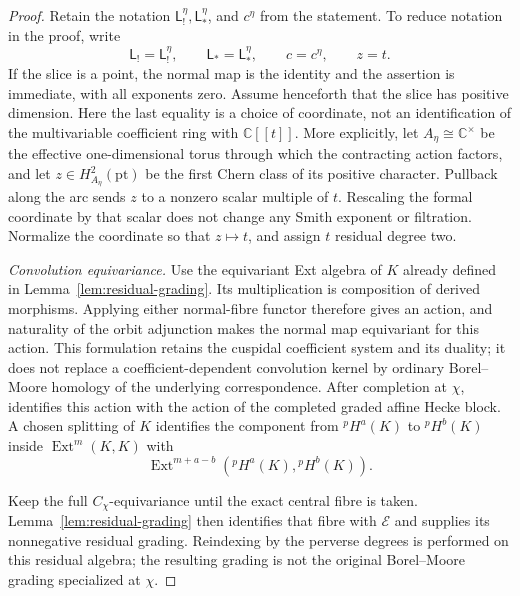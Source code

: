 \documentclass[11pt]{amsart}
\theoremstyle{definition}
\theoremstyle{remark}
\begin{document}
\begin{proof}
Retain the notation $\mathsf L_!^\eta,\mathsf L_*^\eta$, and $c^\eta$ from
the statement.  To reduce notation in the proof, write
\[
 \mathsf L_!=\mathsf L_!^\eta,\qquad
 \mathsf L_*=\mathsf L_*^\eta,\qquad
 c=c^\eta,\qquad z=t.
\]
If the slice is a point, the normal map is the identity and the assertion
is immediate, with all exponents zero.  Assume henceforth that the slice
has positive dimension.  Here the last equality is a choice of coordinate, not an identification of
the multivariable coefficient ring with $\mathbb C[[t]]$.  More explicitly,
let $A_\eta\cong\mathbb C^\times$ be the effective one-dimensional torus
through which the contracting action factors, and let
$z\in H_{A_\eta}^2(\mathrm{pt})$ be the first Chern class of its positive
character.  Pullback along the arc sends $z$ to a nonzero scalar multiple of
$t$.  Rescaling the formal coordinate by that scalar does not change any
Smith exponent or filtration.  Normalize the coordinate so that $z\mapsto t$,
and assign $t$ residual degree two.

\smallskip
\noindent\emph{Convolution equivariance.}
Use the equivariant Ext algebra of $K$ already defined in
Lemma~\ref{lem:residual-grading}.  Its multiplication is composition
of derived morphisms.  Applying either normal-fibre functor therefore
gives an action, and naturality of the orbit adjunction makes the
normal map equivariant for this action.  This formulation retains the
cuspidal coefficient system and its duality; it does not replace a
coefficient-dependent convolution kernel by ordinary Borel--Moore
homology of the underlying correspondence.  After completion at $\chi$,
\cite[Theorem~2.5]{Solleveld} identifies this action with the action of the
completed graded affine Hecke block.  A chosen
splitting of $K$ identifies the component from ${}^pH^a(K)$ to
${}^pH^b(K)$ inside $\operatorname{Ext}^m(K,K)$ with
\[
 \operatorname{Ext}^{m+a-b}({}^pH^a(K),{}^pH^b(K)).
\]

Keep the full $C_\chi$-equivariance until the exact central fibre is taken.
Lemma~\ref{lem:residual-grading} then identifies that fibre with
$\mathcal E$ and supplies its nonnegative residual grading.  Reindexing by
the perverse degrees is performed on this residual algebra; the resulting
grading is not the original Borel--Moore grading specialized at $\chi$.


\end{proof}
\end{document}
